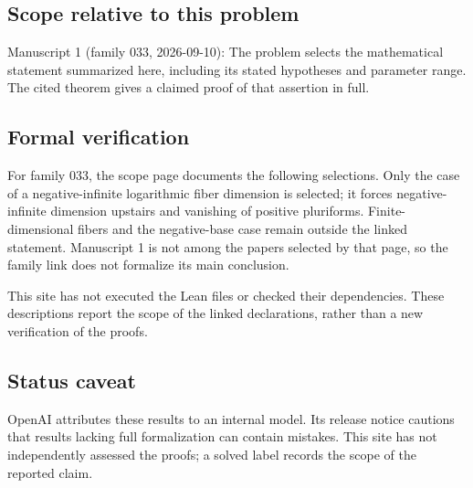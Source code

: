 \documentclass[11pt]{article}
\begin{document}
\subsection{Scope relative to this problem}
Manuscript 1 (family 033, 2026-09-10): The problem selects the mathematical statement summarized here, including its stated hypotheses and parameter range. The cited theorem gives a claimed proof of that assertion in full.

\subsection{Formal verification}
For family 033, the scope page documents the following selections. Only the case of a negative-infinite logarithmic fiber dimension is selected; it forces negative-infinite dimension upstairs and vanishing of positive pluriforms. Finite-dimensional fibers and the negative-base case remain outside the linked statement. Manuscript 1 is not among the papers selected by that page, so the family link does not formalize its main conclusion.

This site has not executed the Lean files or checked their dependencies. These descriptions report the scope of the linked declarations, rather than a new verification of the proofs.

\subsection{Status caveat}
OpenAI attributes these results to an internal model. Its release notice cautions that results lacking full formalization can contain mistakes. This site has not independently assessed the proofs; a solved label records the scope of the reported claim.
\end{document}
